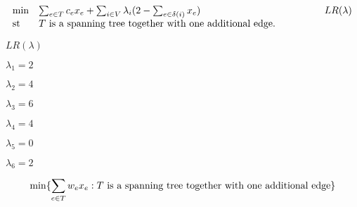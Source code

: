 {\newpage\clearpage
{}%
\begin{displaymath}
                \begin{array}{llr}
                   \min      & \sum_{e \in  T}c_ex_e +
         \sum_{i \in V}\lambda_i(2-\sum_{e \in \delta(i)}x_e)
               &     \qquad  \qquad  LR(\lambda)  \\
                   \mbox{st } & \mbox{$T$\space is a spanning tree together with
                                        one additional edge.}
                \end{array}
              \end{displaymath}%
\lthtmldisplayZ
\hfill\lthtmlcheckvsize\clearpage}

{\newpage\clearpage
{}%
$LR(\lambda)$%
\lthtmlinlinemathZ
\hfill\lthtmlcheckvsize\clearpage}

{\newpage\clearpage
{}%
$\lambda_1=2$%
\lthtmlinlinemathZ
\hfill\lthtmlcheckvsize\clearpage}

{\newpage\clearpage
{}%
$\lambda_2=4$%
\lthtmlinlinemathZ
\hfill\lthtmlcheckvsize\clearpage}

{\newpage\clearpage
{}%
$\lambda_3=6$%
\lthtmlinlinemathZ
\hfill\lthtmlcheckvsize\clearpage}

{\newpage\clearpage
{}%
$\lambda_4=4$%
\lthtmlinlinemathZ
\hfill\lthtmlcheckvsize\clearpage}

{\newpage\clearpage
{}%
$\lambda_5=0$%
\lthtmlinlinemathZ
\hfill\lthtmlcheckvsize\clearpage}

{\newpage\clearpage
{}%
$\lambda_6=2$%
\lthtmlinlinemathZ
\hfill\lthtmlcheckvsize\clearpage}

{\newpage\clearpage
{}%
\begin{displaymath}
                 \min\{\sum_{e \in T}w_ex_e :
                    \mbox{$T$\space is a spanning tree together with
                                        one additional edge}\}
              \end{displaymath}%
\lthtmldisplayZ
\hfill\lthtmlcheckvsize\clearpage}

